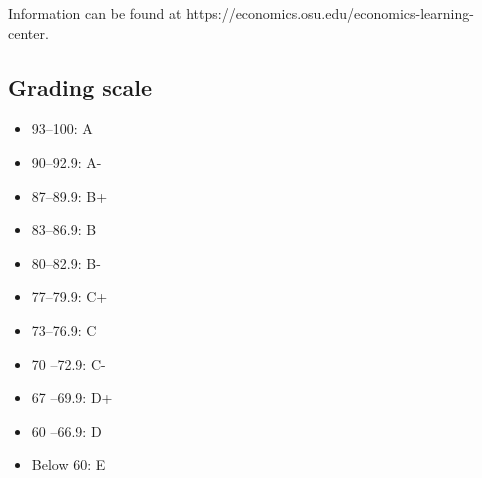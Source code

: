 \documentclass[12pt]{article}
\begin{document}
Information can be found at https://economics.osu.edu/economics-learning-center.

\subsection*{Grading scale}
\begin{itemize}
    \item 93–100: A
    \item 90–92.9: A-
    \item 87–89.9: B+
    \item 83–86.9: B
    \item 80–82.9: B-
    \item 77–79.9: C+
    \item 73–76.9: C
    \item 70 –72.9: C-
    \item 67 –69.9: D+
    \item 60 –66.9: D
    \item Below 60: E
\end{itemize}








\printbibliography
\end{document}
